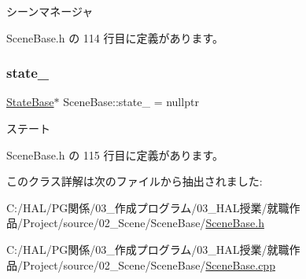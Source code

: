 シーンマネージャ 



 Scene\+Base.\+h の 114 行目に定義があります。

\mbox{\label{class_scene_base_a9d8b7237f492e9ce0724714393b0e881}} 
\subsubsection{\texorpdfstring{state\+\_\+}{state\_}}
{\footnotesize\ttfamily \mbox{\hyperlink{class_scene_base_1_1_state_base}{State\+Base}}$\ast$ Scene\+Base\+::state\+\_\+ = nullptr\hspace{0.3cm}{\ttfamily [private]}}



ステート 



 Scene\+Base.\+h の 115 行目に定義があります。



このクラス詳解は次のファイルから抽出されました\+:\begin{DoxyCompactItemize}
\item 
C\+:/\+H\+A\+L/\+P\+G関係/03\+\_\+作成プログラム/03\+\_\+\+H\+A\+L授業/就職作品/\+Project/source/02\+\_\+\+Scene/\+Scene\+Base/\mbox{\hyperlink{_scene_base_8h}{Scene\+Base.\+h}}\item 
C\+:/\+H\+A\+L/\+P\+G関係/03\+\_\+作成プログラム/03\+\_\+\+H\+A\+L授業/就職作品/\+Project/source/02\+\_\+\+Scene/\+Scene\+Base/\mbox{\hyperlink{_scene_base_8cpp}{Scene\+Base.\+cpp}}\end{DoxyCompactItemize}
